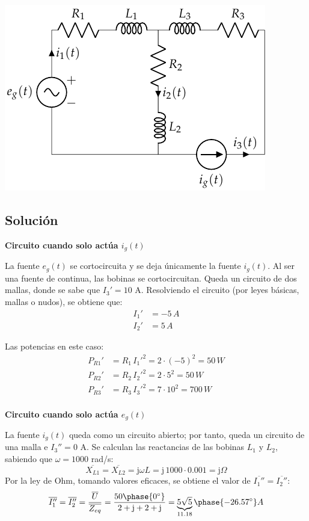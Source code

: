 \begin{center}
  \includegraphics{figuras/BT2_18.pdf}
\end{center}

\subsection*{Solución}

\textbf{Circuito cuando solo actúa $i_g(t)$}
    
La fuente $e_g(t)$ se cortocircuita y se deja únicamente la fuente
$i_g(t)$. Al ser una fuente de continua, las bobinas se
cortocircuitan. Queda un circuito de dos mallas, donde se sabe que
$I_3'=10$ A. Resolviendo el circuito (por leyes básicas, mallas o
nudos), se obtiene que:
\begin{align*}
  I_1'&=-5\,A\\
  I_2'&=5\,A
\end{align*}
    
Las potencias en este caso:
\begin{align*}
  P_{R1}'&=R_1\,I_1'^2=2\cdot (-5)^2=50\,W\\
  P_{R2}'&=R_2\,I_2'^2=2\cdot 5^2=50\,W\\
  P_{R3}'&=R_3\,I_3'^2=7\cdot 10^2=700\,W\\
\end{align*}
    
\textbf{Circuito cuando solo actúa $e_g(t)$}
    
La fuente $i_g(t)$ queda como un circuito abierto; por tanto, queda un
circuito de una malla e $I_3''=0$ A. Se calculan las reactancias de
las bobinas $L_1$ y $L_2$, sabiendo que $\omega=1000$ rad/s:
\begin{equation*}
  \overline{X_{L1}}=\overline{X_{L2}}=\mathrm{j}\omega L=\mathrm{j}\, 1000\cdot 0.001 = \mathrm{j}\Omega
\end{equation*}
Por la ley de Ohm, tomando valores eficaces, se obtiene el valor de
$\overline{I_1''}=\overline{I_2''}$:
\begin{equation*}
  \overline{I_1''}=\overline{I_2''}=\dfrac{\overline{U}}{\overline{Z_{eq}}}=\dfrac{50\phase{0^\circ}}{2+\mathrm{j}+2+\mathrm{j}}=\underbrace{5\sqrt{5}}_{11.18}\phase{-26.57^\circ} A
\end{equation*}
    
